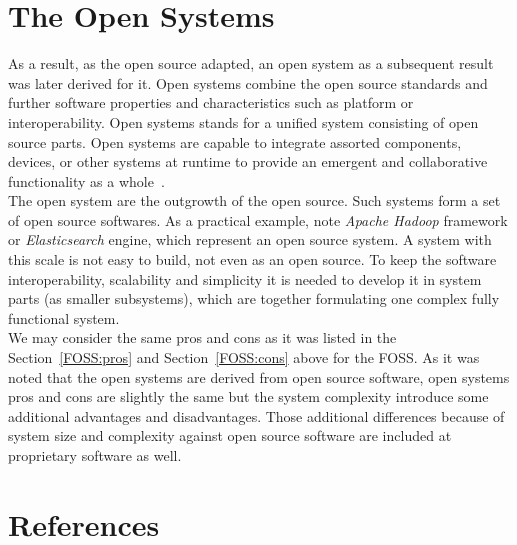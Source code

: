 \documentclass[12pt,a4paper]{article}
\theoremstyle{definition}
\begin{document}
\section{The Open Systems}

    As a result, as the open source adapted, an open system as a subsequent result was later derived for it. Open systems combine the open source standards and further software properties and characteristics such as platform or interoperability. Open systems stands for a unified system consisting of open source parts. Open systems are capable to integrate assorted components, devices, or other systems at runtime to provide an emergent and collaborative functionality as a whole~\cite{opensys1}.\\

    The open system are the outgrowth of the open source. Such systems form a set of open source softwares. As a practical example, note \textit{Apache Hadoop} framework or \textit{Elasticsearch} engine, which represent an open source system. A system with this scale is not easy to build, not even as an open source. To keep the software interoperability, scalability and simplicity it is needed to develop it in system parts (as smaller subsystems), which are together formulating one complex fully functional system.\\

    We may consider the same pros and cons as it was listed in the Section~\ref{FOSS:pros} and Section~\ref{FOSS:cons} above for the FOSS. As it was noted that the open systems are derived from open source software, open systems pros and cons are slightly the same but the system complexity introduce some additional advantages and disadvantages. Those additional differences because of system size and complexity against open source software are included at proprietary software as well.

\newpage

\section{References}

\begin{flushleft}
    
\end{flushleft}
\end{document}
